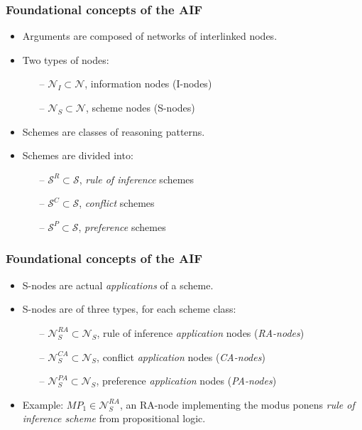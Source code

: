 \documentclass{beamer}
\begin{document}
\begin{frame}
\frametitle{Foundational concepts of the AIF}
\begin{itemize}
\item Arguments are composed of networks of interlinked nodes. \pause
\item Two types of nodes: \pause
  \begin{itemize}
  \item[--] $\mathcal{N}_I \subset \mathcal{N}$, information nodes (I-nodes) \pause
  \item[--] $\mathcal{N}_S \subset \mathcal{N}$, scheme nodes (S-nodes)
  \end{itemize}
\item Schemes are classes of reasoning patterns. \pause
\item Schemes are divided into: \pause
  \begin{itemize}
  \item[--] $\mathcal{S}^R \subset \mathcal{S}$, \emph{rule of inference} schemes \pause
  \item[--] $\mathcal{S}^C \subset \mathcal{S}$, \emph{conflict} schemes \pause
  \item[--] $\mathcal{S}^P \subset \mathcal{S}$, \emph{preference} schemes
  \end{itemize}
\end{itemize}
\end{frame}

\begin{frame}
\frametitle{Foundational concepts of the AIF}
\begin{itemize}
\item S-nodes are actual \emph{applications} of a scheme. \pause
\item S-nodes are of three types, for each scheme class: \pause
  \begin{itemize}
  \item[--] $\mathcal{N}_S^{RA} \subset \mathcal{N}_S$, rule of inference \emph{application} nodes (\emph{RA-nodes}) \pause
  \item[--] $\mathcal{N}_S^{CA} \subset \mathcal{N}_S$, conflict \emph{application} nodes (\emph{CA-nodes}) \pause
  \item[--] $\mathcal{N}_S^{PA} \subset \mathcal{N}_S$, preference \emph{application} nodes (\emph{PA-nodes}) \pause
  \end{itemize}
\item Example: $MP_1 \in \mathcal{N}_S^{RA}$, an RA-node implementing the modus ponens \emph{rule of inference scheme} from propositional logic.
\end{itemize}
\end{frame}
\end{document}
